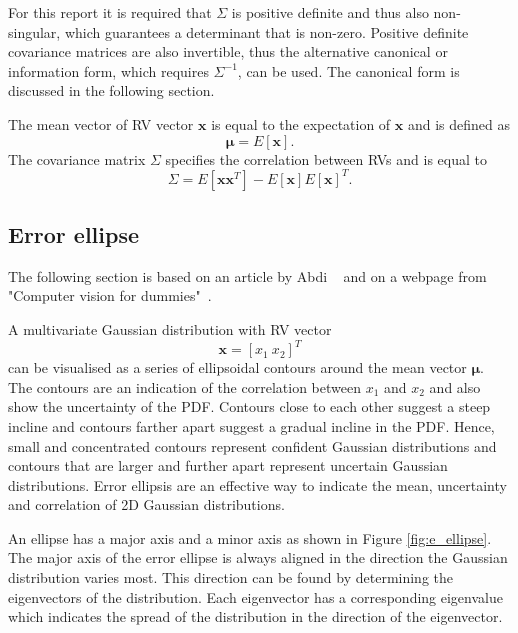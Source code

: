 \documentclass[12pt,oneside,openany,a4paper, %
afrikaans,english,
]{memoir}
\numberwithin{equation}{chapter}
\begin{document}
For this report it is required that $\Sigma$ is positive definite and thus also non-singular, which guarantees a determinant that is non-zero. Positive definite covariance matrices are also invertible, thus the alternative canonical or information form, which requires $\Sigma^{-1}$, can be used. The canonical form is discussed in the following section.

The mean vector of RV vector $\bm{x}$ is equal to the expectation of $\bm{x}$ and is defined as
\begin{equation}
\bm{\mu} = E[\bm{x}].
\end{equation}
The covariance matrix $\Sigma$ specifies the correlation between RVs and is equal to
\begin{equation}
\Sigma = E[\bm{xx}^T] - E[\bm{x}]E[\bm{x}]^T.
\end{equation}
\subsection{Error ellipse}The following section is based on an article by Abdi ~\cite{abdi} and on a webpage from "Computer vision for dummies"~\cite{draw_ellipse}.

A multivariate Gaussian distribution with RV vector
\begin{equation}
\bm{x} = [x_1\ x_2]^T
\end{equation}
can be visualised as a series of ellipsoidal contours around the mean vector $\bm{\mu}$. The contours are an indication of the correlation between $x_1$ and $x_2$ and also show the uncertainty of the PDF. Contours close to each other suggest a steep incline and contours farther apart suggest a gradual incline in the PDF. Hence, small and concentrated contours represent confident Gaussian distributions and contours that are larger and further apart represent uncertain Gaussian distributions. Error ellipsis are an effective way to indicate the mean, uncertainty and correlation of 2D Gaussian distributions.

An ellipse has a major axis and a minor axis as shown in Figure \ref{fig:e_ellipse}. The major axis of the error ellipse is always aligned in the direction the Gaussian distribution varies most. This direction can be found by determining the eigenvectors of the distribution. Each eigenvector has a corresponding eigenvalue which indicates the spread of the distribution in the direction of the eigenvector. 
\end{document}

